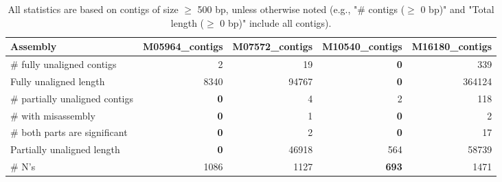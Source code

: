 \documentclass[12pt,a4paper]{article}
\begin{document}
\begin{table}[ht]
\begin{center}
\caption{All statistics are based on contigs of size $\geq$ 500 bp, unless otherwise noted (e.g., "\# contigs ($\geq$ 0 bp)" and "Total length ($\geq$ 0 bp)" include all contigs).}
\begin{tabular}{|l*{4}{|r}|}
\hline
Assembly & M05964\_contigs & M07572\_contigs & M10540\_contigs & M16180\_contigs \\ \hline
\# fully unaligned contigs & 2 & 19 & {\bf 0} & 339 \\ \hline
Fully unaligned length & 8340 & 94767 & {\bf 0} & 364124 \\ \hline
\# partially unaligned contigs & {\bf 0} & 4 & 2 & 118 \\ \hline
\hspace{5mm}\# with misassembly & {\bf 0} & 1 & {\bf 0} & 2 \\ \hline
\hspace{5mm}\# both parts are significant & {\bf 0} & 2 & {\bf 0} & 17 \\ \hline
Partially unaligned length & {\bf 0} & 46918 & 564 & 58739 \\ \hline
\# N's & 1086 & 1127 & {\bf 693} & 1471 \\ \hline
\end{tabular}
\end{center}
\end{table}
\end{document}
